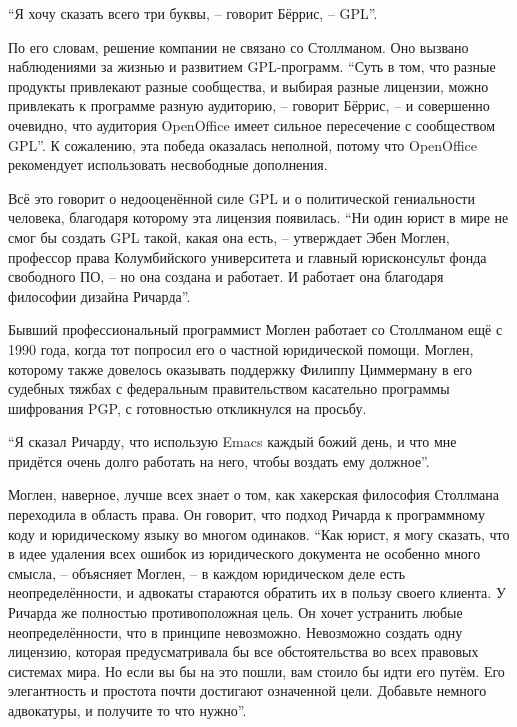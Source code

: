 \enquote{Я хочу сказать всего три буквы, -- говорит Бёррис, -- GPL}.

По его словам, решение компании не связано со Столлманом. Оно вызвано наблюдениями за жизнью и развитием GPL-программ. \enquote{Суть в том, что разные продукты привлекают разные сообщества, и выбирая разные лицензии, можно привлекать к программе разную аудиторию, -- говорит Бёррис, -- и совершенно очевидно, что аудитория OpenOffice имеет сильное пересечение с сообществом GPL}. К сожалению, эта победа оказалась неполной, потому что OpenOffice рекомендует использовать несвободные дополнения.

Всё это говорит о недооценённой силе GPL и о политической гениальности человека, благодаря которому эта лицензия появилась. \enquote{Ни один юрист в мире не смог бы создать GPL такой, какая она есть, -- утверждает Эбен Моглен, профессор права Колумбийского университета и главный юрисконсульт фонда свободного ПО, -- но она создана и работает. И работает она благодаря философии дизайна Ричарда}.

Бывший профессиональный программист Моглен работает со Столлманом ещё с 1990 года, когда тот попросил его о частной юридической помощи. Моглен, которому также довелось оказывать поддержку Филиппу Циммерману в его судебных тяжбах с федеральным правительством касательно программы шифрования PGP, с готовностью откликнулся на просьбу.

\enquote{Я сказал Ричарду, что использую Emacs каждый божий день, и что мне придётся очень долго работать на него, чтобы воздать ему должное}.

Моглен, наверное, лучше всех знает о том, как хакерская философия Столлмана переходила в область права. Он говорит, что подход Ричарда к программному коду и юридическому языку во многом одинаков. \enquote{Как юрист, я могу сказать, что в идее удаления всех ошибок из юридического документа не особенно много смысла, -- объясняет Моглен, -- в каждом юридическом деле есть неопределённости, и адвокаты стараются обратить их в пользу своего клиента. У Ричарда же полностью противоположная цель. Он хочет устранить любые неопределённости, что в принципе невозможно. Невозможно создать одну лицензию, которая предусматривала бы все обстоятельства во всех правовых системах мира. Но если вы бы на это пошли, вам стоило бы идти его путём. Его элегантность и простота почти достигают означенной цели. Добавьте немного адвокатуры, и получите то что нужно}.

